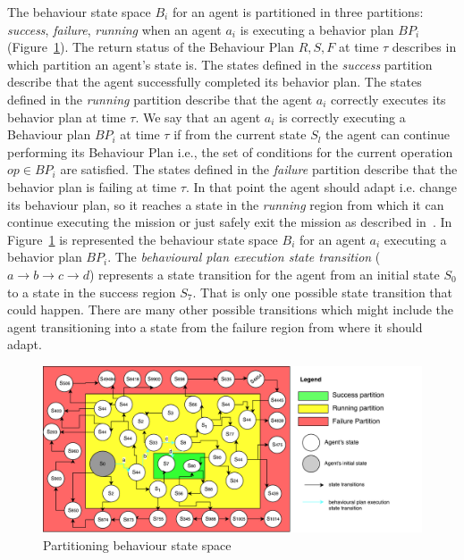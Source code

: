 \documentclass[journal]{IEEEtran}
\theoremstyle{definition}
\newcommand\patrizio[1]{\nb{Patrizio}{#1}}
\begin{document}
The behaviour state space $B_i$ for an agent is partitioned in three partitions: \textit{success}, \textit{failure}, \textit{running} when an agent $a_i$ is executing a behavior plan $BP_i$ (Figure~\ref{fig:BS}). The return status of the Behaviour Plan ${R, S, F}$ at time $\tau$ describes in which partition an agent's state is. The states defined in the \textit{success} partition describe that the agent successfully completed its behavior plan. 
The states defined in the \textit{running} partition describe that the agent $a_i$ correctly executes its behavior plan at time $\tau$. We say that an agent $a_i$ is correctly executing a Behaviour plan $BP_i$ at time $\tau$ if from the current state $S_l$ the agent can continue performing its Behaviour Plan i.e., the set of conditions for the current operation $op \in BP_i$ are satisfied. %
The states defined in the \textit{failure} partition describe that the behavior plan is failing at time $\tau$. In that point the agent should adapt i.e. change its behaviour plan, so it reaches a state in the \textit{running} region from which it can continue executing the mission or just safely exit the mission as described in~\cite{di2013engineering}. In Figure~\ref{fig:BS} is represented the behaviour state space $B_i$ for an agent $a_i$ executing a behavior plan $BP_i$. The \textit{behavioural plan execution state transition} ($a \rightarrow b \rightarrow c \rightarrow d$) represents a state transition for the agent from an initial state  $S_0$ to a state in the success region $S_7$. That is only one possible state transition that could happen. There are many other possible transitions which might include the agent transitioning into a state from the failure region from where it should adapt.




\begin{figure}[h]
\includegraphics[width=\columnwidth]{Figures/BS5.pdf}
\caption{Partitioning behaviour state space}\label{fig:BS}
\end{figure}
\end{document}
